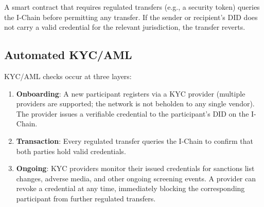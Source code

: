A smart contract that requires regulated transfers (e.g., a
security token) queries the I-Chain before permitting any transfer.
If the sender or recipient's DID does not carry a valid credential
for the relevant jurisdiction, the transfer reverts.

\subsection{Automated KYC/AML}

KYC/AML checks occur at three layers:

\begin{enumerate}[nosep]
  \item \textbf{Onboarding}: A new participant registers via a KYC
        provider (multiple providers are supported; the network is
        not beholden to any single vendor). The provider issues a
        verifiable credential to the participant's DID on the
        I-Chain.
  \item \textbf{Transaction}: Every regulated transfer queries the
        I-Chain to confirm that both parties hold valid credentials.
  \item \textbf{Ongoing}: KYC providers monitor their issued
        credentials for sanctions list changes, adverse media, and
        other ongoing screening events. A provider can revoke a
        credential at any time, immediately blocking the
        corresponding participant from further regulated transfers.
\end{enumerate}

